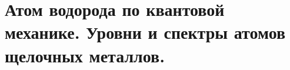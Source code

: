 \chapter{Атом водорода по квантовой механике. Уровни и спектры атомов 
щелочных металлов.}

\newpage
